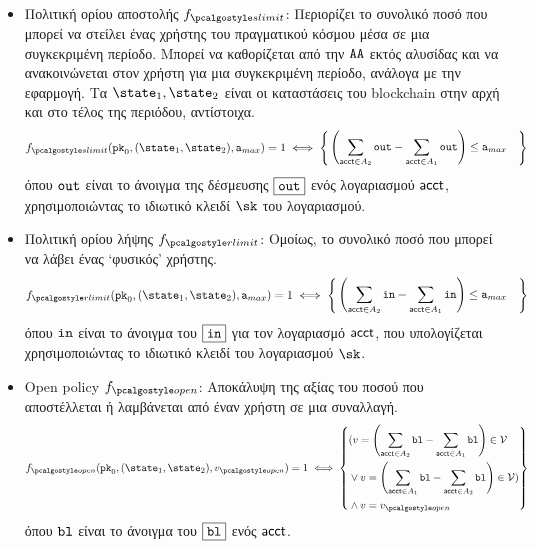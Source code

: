 \begin{itemize}
    \item Πολιτική ορίου αποστολής $f_{\sendlimit}$: Περιορίζει το συνολικό ποσό που μπορεί να στείλει ένας χρήστης του πραγματικού κόσμου μέσα σε μια συγκεκριμένη περίοδο. Μπορεί να καθορίζεται από την $\AA$ εκτός αλυσίδας και να ανακοινώνεται στον χρήστη για μια συγκεκριμένη περίοδο, ανάλογα με την εφαρμογή. Τα $\snap_1, \snap_2$ είναι οι καταστάσεις του blockchain στην αρχή και στο τέλος της περιόδου, αντίστοιχα.
    \begin{align*}
        f_{\sendlimit}(\inpk, (\snap_1, \snap_2), \srlimit) = 1 \iff 
        \left\{ \begin{aligned}
                            &  \left(\sum_{\acct\in A_2}{\varout} - \sum_{\acct \in A_1}{\varout} \right)
                            \leq \srlimit 
                 \end{aligned} \right\}
    \end{align*}
    όπου $\varout$ είναι το άνοιγμα της δέσμευσης $\comm{\varout}$ ενός λογαριασμού $\acct$, χρησιμοποιώντας το ιδιωτικό κλειδί $\sk$ του λογαριασμού.

    \item Πολιτική ορίου λήψης $f_{\receivelimit}$: Ομοίως, το συνολικό ποσό που μπορεί να λάβει ένας `φυσικός' χρήστης.
        \begin{align*}
           f_{\receivelimit}(\inpk, (\snap_1, \snap_2), \srlimit) = 1  \iff 
           \left\{ \begin{aligned} 
                    & \left(\sum_{\acct\in A_2}{\varin} - \sum_{\acct \in A_1}{\varin}\right) \leq \srlimit
            \end{aligned} \right\}
        \end{align*}
        όπου $\varin$ είναι το άνοιγμα του $\comm{\varin}$ για τον λογαριασμό $\acct$, που υπολογίζεται χρησιμοποιώντας το ιδιωτικό κλειδί του λογαριασμού $\sk$.


    \item Open policy $f_{\open}$: Αποκάλυψη της αξίας του ποσού που αποστέλλεται ή λαμβάνεται από έναν χρήστη σε μια συναλλαγή.
    \begin{align*}
        f_{\open}(\inpk, (\snap_1, \snap_2), v_{\open}) = 1 \iff 
        \left\{ \begin{aligned}   
        & (v = \left(\sum_{\acct \in A_{2}}\varbl - \sum_{\acct \in A_{1}}\varbl \right)\in \vset \\
        &\lor v = \left(\sum_{\acct \in A_{1}}\varbl - \sum_{\acct \in A_{2}}\varbl \right)\in \vset )\\
        & \land v = v_{\open} 
    \end{aligned} \right\}
    \end{align*}
    όπου $\varbl$ είναι το άνοιγμα του $\comm{\varbl}$ ενός $\acct$.


\end{itemize}

